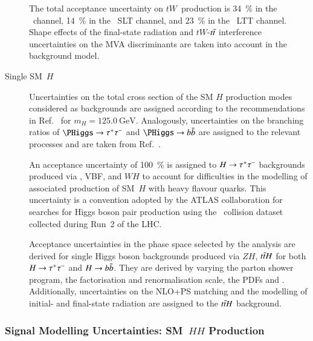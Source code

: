 \begin{description}
  The total acceptance uncertainty on $tW$~production is \SI{34}{\percent} in
  the \hadhad~channel, \SI{14}{\percent} in the \lephad~SLT channel, and
  \SI{23}{\percent} in the \lephad~LTT channel. Shape effects of the final-state
  radiation and $tW$-$t\bar{t}$ interference uncertainties on the MVA
  discriminants are taken into account in the background model.

\item[Single SM~$H$] Uncertainties on the total cross section of the SM $H$
  production modes considered as backgrounds are assigned according to the
  recommendations in Ref.~\cite{deFlorian:2016spz} for
  $m_{H} = \SI{125.0}{\GeV}$. Analogously, uncertainties on the branching ratios
  of $\PHiggs \to \tautau$ and $\PHiggs \to \bbbar$ are assigned to the relevant
  processes and are taken from Ref.~\cite{deFlorian:2016spz}.

  An acceptance uncertainty of \SI{100}{\percent} is assigned to $H \to \tau^{+} \tau^{-}$
  backgrounds produced via \ggF, VBF, and $WH$ to account for difficulties in
  the modelling of associated production of SM~$H$ with heavy flavour
  quarks. This uncertainty is a convention adopted by the ATLAS collaboration
  for searches for Higgs boson pair production using the \pp~collision dataset
  collected during Run~2 of the LHC.

  Acceptance uncertainties in the phase space selected by the analysis are
  derived for single Higgs boson backgrounds produced via $ZH$, $t\bar{t} H$ for
  both $H \to \tau^{+} \tau^{-}$ and $H \to b\bar{b}$. They are derived by varying the
  parton shower program, the factorisation and renormalisation scale, the PDFs
  and \alphas. Additionally, uncertainties on the NLO+PS matching and the
  modelling of initial- and final-state radiation are assigned to the $t\bar{t} H$
  background.
\end{description}





\subsubsection{Signal Modelling Uncertainties: SM~$HH$ Production}

